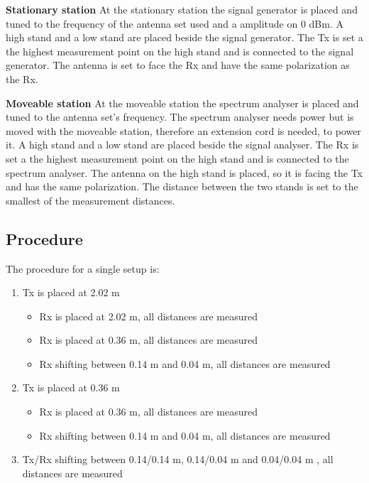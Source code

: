 \textbf{Stationary station}
At the stationary station the signal generator is placed and tuned to the frequency of the antenna set used and a amplitude on 0 dBm. A high stand and a low stand are placed beside the signal generator. The Tx is set a the highest measurement point on the high stand and is connected to the signal generator. The antenna is set to face the Rx and have the same polarization as the Rx.

\textbf{Moveable station}
At the moveable station the spectrum analyser is placed and tuned to the antenna set's frequency. The spectrum analyser needs power but is moved with the moveable station, therefore an extension cord is needed, to power it. A high stand and a low stand are placed beside the signal analyser. The Rx is set a the highest measurement point on the high stand and is connected to the spectrum analyser. The antenna on the high stand is placed, so it is facing the Tx and has the same polarization. The distance between the two stands is set to the smallest of the measurement distances.


\subsection*{Procedure}
The procedure for a single setup is:

\begin{enumerate}
\item Tx is placed at 2.02 m
\begin{itemize}
\item Rx is placed at 2.02 m, all distances are measured
\item Rx is placed at 0.36 m, all distances are measured
\item Rx shifting between 0.14 m and 0.04 m, all distances are measured
\end{itemize}
\item Tx is placed at 0.36 m
\begin{itemize}
\item Rx is placed at 0.36 m, all distances are measured
\item Rx shifting between 0.14 m and 0.04 m, all distances are measured
\end{itemize}
\item Tx/Rx shifting between 0.14/0.14 m, 0.14/0.04 m and 0.04/0.04 m , all distances are measured
\end{enumerate}

